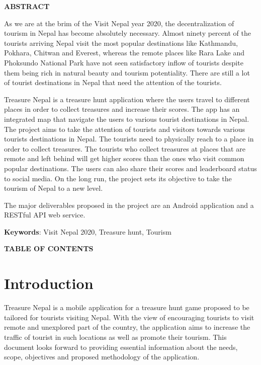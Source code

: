 \documentclass[12pt, a4paper, oneside]{article}
\begin{document}
\large
\begin{center}
	\textbf{ABSTRACT}
\end{center}

\normalsize
As we are at the brim of the Visit Nepal year 2020, the decentralization of tourism in Nepal has become absolutely necessary. Almost ninety percent of the tourists arriving Nepal visit the most popular destinations like Kathmandu, Pokhara, Chitwan and Everest, whereas the remote places like Rara Lake and Phoksundo National Park have not seen satisfactory inflow of tourists despite them being rich in natural beauty and tourism potentiality. There are still a lot of tourist destinations in Nepal that need the attention of the tourists.

Treasure Nepal is a treasure hunt application where the users travel to different places in order to collect treasures and increase their scores. The app has an integrated map that navigate the users to various tourist destinations in Nepal. The project aims to take the attention of tourists and visitors towards various tourists destinations in Nepal. The tourists need to physically reach to a place in order to collect treasures. The tourists who collect treasures at places that are remote and left behind will get higher scores than the ones who visit common popular destinations. The users can also share their scores and leaderboard status to social media. On the long run, the project sets its objective to take the tourism of Nepal to a new level.

The major deliverables proposed in the project are an Android application and a RESTful API web service.

\textbf{Keywords}: Visit Nepal 2020, Treasure hunt, Tourism\\

\break

\large
{}
\begin{center}
	\textbf{TABLE OF CONTENTS}
\end{center}


\normalsize
\setlength{\cftbeforetoctitleskip}{0pt}
\renewcommand{\contentsname}{}
\tableofcontents

\break

\cfoot{\textbf{\thepage} /  \pageref{LastPage}}

\section{Introduction} 
Treasure Nepal is a mobile application for a treasure hunt game proposed to be tailored for tourists visiting Nepal. With the view of encouraging tourists to visit remote and unexplored part of the country, the application aims to increase the traffic of tourist in such locations as well as promote their tourism. This document looks forward to providing essential information about the needs, scope, objectives and proposed methodology of the application.
\end{document}
